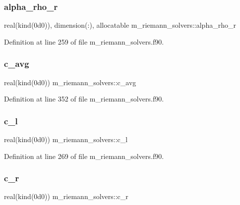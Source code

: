 \subsubsection{\texorpdfstring{alpha\+\_\+rho\+\_\+r}{alpha\_rho\_r}}
{\footnotesize\ttfamily real(kind(0d0)), dimension(\+:), allocatable m\+\_\+riemann\+\_\+solvers\+::alpha\+\_\+rho\+\_\+r}



Definition at line 259 of file m\+\_\+riemann\+\_\+solvers.\+f90.

\mbox{\label{namespacem__riemann__solvers_a2739a94dffd4557f28f432f86aff6c45}} 
\subsubsection{\texorpdfstring{c\+\_\+avg}{c\_avg}}
{\footnotesize\ttfamily real(kind(0d0)) m\+\_\+riemann\+\_\+solvers\+::c\+\_\+avg}



Definition at line 352 of file m\+\_\+riemann\+\_\+solvers.\+f90.

\mbox{\label{namespacem__riemann__solvers_a9c1dab7bfde55cdc6f738752c077f08a}} 
\subsubsection{\texorpdfstring{c\+\_\+l}{c\_l}}
{\footnotesize\ttfamily real(kind(0d0)) m\+\_\+riemann\+\_\+solvers\+::c\+\_\+l}



Definition at line 269 of file m\+\_\+riemann\+\_\+solvers.\+f90.

\mbox{\label{namespacem__riemann__solvers_a9393a8d17da2a98f5061804baca0349d}} 
\subsubsection{\texorpdfstring{c\+\_\+r}{c\_r}}
{\footnotesize\ttfamily real(kind(0d0)) m\+\_\+riemann\+\_\+solvers\+::c\+\_\+r}




